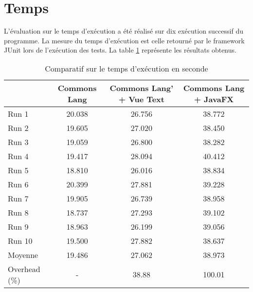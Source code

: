 \section{Temps}
\label{temps}

L'évaluation sur le temps d'exécution a été réalisé sur dix exécution successif du programme. La mesure du temps d'exécution est celle retourné par le framework JUnit lors de l'exécution des tests. La table \ref{evaluation_temps} représente les résultats obtenus.

\begin{table}[h]
\centering
\begin{tabular}{|l|c|c|c|}
\hline
         & Commons Lang & Commons Lang' + Vue Text & Commons Lang + JavaFX\\
         \hline
Run 1     & 20.038  & 26.756       & 38.772        \\
Run 2     & 19.605  & 27.020       & 38.450        \\
Run 3     & 19.059  & 26.800       & 38.282        \\
Run 4     & 19.417  & 28.094       & 40.412        \\
Run 5     & 18.810  & 26.016       & 38.834        \\
Run 6     & 20.399  & 27.881       & 39.228        \\
Run 7     & 19.905  & 26.739       & 38.958        \\
Run 8     & 18.737  & 27.293       & 39.102        \\
Run 9     & 18.963  & 26.199       & 39.056        \\
Run 10    & 19.500  & 27.882       & 38.637        \\
\hline
Moyenne  & 19.486  & 27.062       & 38.973        \\
\hline
Overhead (\%) & -  & 38.88       & 100.01   \\
\hline    
\end{tabular}
\caption{Comparatif sur le temps d'exécution en seconde}
\label{evaluation_temps}
\end{table}
